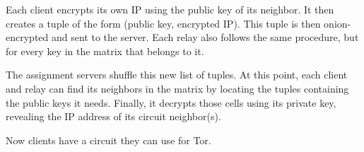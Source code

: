 Each client encrypts its own IP using the public key of its neighbor. It then
creates a tuple of the form (public key, encrypted IP). This tuple is then
onion-encrypted and sent to the server.  Each relay also follows the same
procedure, but for every key in the matrix that belongs to it.

The assignment servers shuffle this new list of tuples. At this point, each
client and relay can find its neighbors in the matrix by locating the tuples
containing the public keys it needs. Finally, it decrypts those cells using
its private key, revealing the IP address of its circuit neighbor(s).

Now clients have a circuit they can use for Tor.

	




